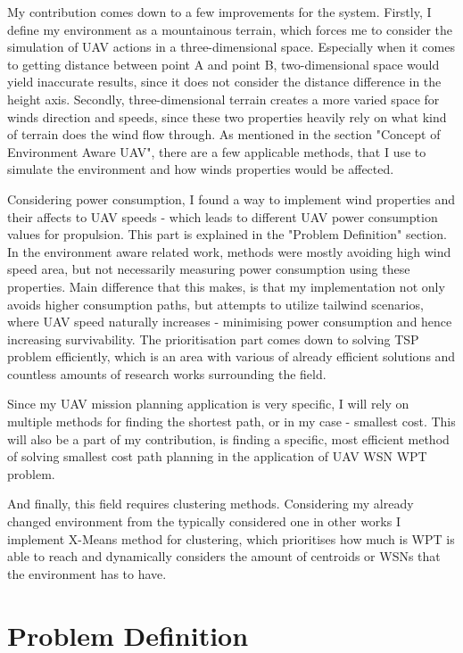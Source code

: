 \documentclass[11pt,a4paper,footinclude=true,headinclude=true, oneside]{scrbook}
\begin{document}
My contribution comes down to a few improvements for the system. Firstly, I define my environment as a mountainous terrain, which forces me to consider the simulation of UAV actions in a three-dimensional space. Especially when it comes to getting distance between point A and point B, two-dimensional space would yield inaccurate results, since it does not consider the distance difference in the height axis. Secondly, three-dimensional terrain creates a more varied space for winds direction and speeds, since these two properties heavily rely on what kind of terrain does the wind flow through. As mentioned in the section "Concept of Environment Aware UAV", there are a few applicable methods, that I use to simulate the environment and how winds properties would be affected.

Considering power consumption, I found a way to implement wind properties and their affects to UAV speeds - which leads to different UAV power consumption values for propulsion. This part is explained in the "Problem Definition" section. In the environment aware related work, methods were mostly avoiding high wind speed area, but not necessarily measuring power consumption using these properties. Main difference that this makes, is that my implementation not only avoids higher consumption paths, but attempts to utilize tailwind scenarios, where UAV speed naturally increases - minimising power consumption and hence increasing survivability. The prioritisation part comes down to solving TSP problem efficiently, which is an area with various of already efficient solutions and countless amounts of research works surrounding the field.

Since my UAV mission planning application is very specific, I will rely on multiple methods for finding the shortest path, or in my case - smallest cost. This will also be a part of my contribution, is finding a specific, most efficient method of solving smallest cost path planning in the application of UAV WSN WPT problem.

And finally, this field requires clustering methods. Considering my already changed environment from the typically considered one in other works I implement X-Means method for clustering, which prioritises how much is WPT is able to reach and dynamically considers the amount of centroids or WSNs that the environment has to have.

\chapter{Problem Definition}
\end{document}
